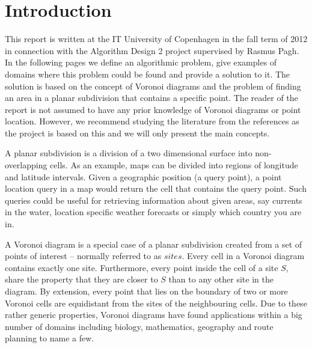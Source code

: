 


\setcounter{page}{1}
\section{Introduction}
\label{introduction}
This report is written at the IT University of Copenhagen in the fall term of 2012 in connection with the Algorithm Design 2 project supervised by Rasmus Pagh. In the following pages we define an algorithmic problem, give examples of domains where this problem could be found and provide a solution to it. The solution is based on the concept of Voronoi diagrams and the problem of finding an area in a planar subdivision that contains a specific point.
The reader of the report is not assumed to have any prior knowledge of Voronoi diagrams or point location. However, we recommend studying the literature from the references as the project is based on this and we will only present the main concepts.

A planar subdivision is a division of a two dimensional surface into non-overlapping cells. As an example, maps can be divided into regions of longitude and latitude intervals. Given a geographic position (a query point), a point location query in a map would return the cell that contains the query point. Such queries could be useful for retrieving information about given areas, say currents in the water, location specific weather forecasts or simply which country you are in. 

A Voronoi diagram is a special case of a planar subdivision created from a set of points of interest – normally referred to as $sites$. Every cell in a Voronoi diagram contains exactly one site. Furthermore, every point inside the cell of a site $S$, share the property that they are closer to $S$ than to any other site in the diagram. By extension, every point that lies on the boundary of two or more Voronoi cells are equidistant from the sites of the neighbouring cells. Due to these rather generic properties, Voronoi diagrams have found applications within a big number of domains including biology, mathematics, geography and route planning to name a few.\cite{voronoi_applications} 

